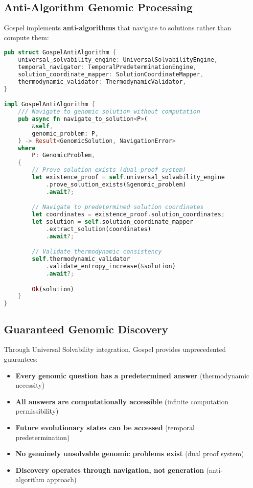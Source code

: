 \documentclass[12pt,a4paper]{article}
\begin{document}
\subsection{Anti-Algorithm Genomic Processing}

Gospel implements \textbf{anti-algorithms} that navigate to solutions rather than compute them:

\begin{lstlisting}[language=Rust, caption=Gospel Anti-Algorithm Architecture, basicstyle=\footnotesize]
pub struct GospelAntiAlgorithm {
    universal_solvability_engine: UniversalSolvabilityEngine,
    temporal_navigator: TemporalPredeterminationEngine,
    solution_coordinate_mapper: SolutionCoordinateMapper,
    thermodynamic_validator: ThermodynamicValidator,
}

impl GospelAntiAlgorithm {
    /// Navigate to genomic solution without computation
    pub async fn navigate_to_solution<P>(
        &self,
        genomic_problem: P,
    ) -> Result<GenomicSolution, NavigationError>
    where
        P: GenomicProblem,
    {
        // Prove solution exists (dual proof system)
        let existence_proof = self.universal_solvability_engine
            .prove_solution_exists(&genomic_problem)
            .await?;

        // Navigate to predetermined solution coordinates  
        let coordinates = existence_proof.solution_coordinates;
        let solution = self.solution_coordinate_mapper
            .extract_solution(coordinates)
            .await?;

        // Validate thermodynamic consistency
        self.thermodynamic_validator
            .validate_entropy_increase(&solution)
            .await?;

        Ok(solution)
    }
}
\end{lstlisting}

\subsection{Guaranteed Genomic Discovery}

Through Universal Solvability integration, Gospel provides unprecedented guarantees:

\begin{itemize}
\item \textbf{Every genomic question has a predetermined answer} (thermodynamic necessity)
\item \textbf{All answers are computationally accessible} (infinite computation permissibility)  
\item \textbf{Future evolutionary states can be accessed} (temporal predetermination)
\item \textbf{No genuinely unsolvable genomic problems exist} (dual proof system)
\item \textbf{Discovery operates through navigation, not generation} (anti-algorithm approach)
\end{itemize}
\end{document}
